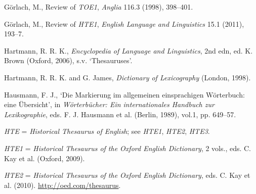 \begin{list}{}
\item %
Görlach, M., Review of \textit{TOE1}, \textit{Anglia} 116.3 (1998), 398–401.

\item %
Görlach, M., Review of \textit{HTE1}, \textit{English Language and Linguistics} 15.1 (2011), 193–7.

\item %
Hartmann, R. R. K., \textit{Encyclopedia of Language and Linguistics}, 2nd edn, ed. K. Brown (Oxford, 2006), s.v. `Thesauruses'.

\item %
Hartmann, R. R. K. and G. James, \textit{Dictionary of Lexicography} (London, 1998).

\item %
Hausmann, F. J., `Die Markierung im allgemeinen einsprachigen Wörterbuch: eine Übersicht', in \textit{Wörterbücher: Ein internationales Handbuch zur Lexikographie}, eds. F. J. Hausmann et al. (Berlin, 1989), vol.1, pp. 649–57.





\item %
\textit{HTE} = \textit{Historical Thesaurus of English}; see \textit{HTE1}, \textit{HTE2}, \textit{HTE3}.

\item %
\textit{HTE1} = \textit{Historical Thesaurus of the Oxford English Dictionary}, 2 vols., eds. C. Kay et al. (Oxford, 2009).

\item %
\textit{HTE2} = \textit{Historical Thesaurus of the Oxford English Dictionary}, eds. C. Kay et al. (2010). \url{http://oed.com/thesaurus}.


\end{list}
